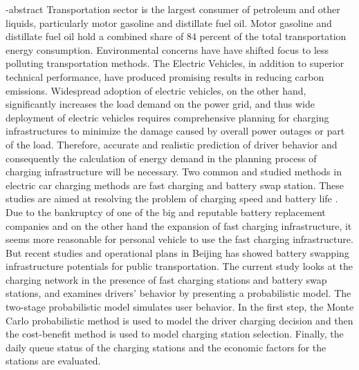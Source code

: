 
\en-abstract{\justifying
Transportation 	sector is the largest consumer of petroleum and other liquids, particularly motor
gasoline and distillate fuel oil. Motor gasoline and distillate fuel oil hold a combined share of 84 percent of the total transportation energy consumption. Environmental concerns have have shifted focus to less polluting transportation methods.	The Electric Vehicles, in addition to superior technical performance, have produced promising results in reducing carbon emissions.
 Widespread adoption of electric vehicles, on the other hand, significantly increases the load demand on the power grid, and thus wide deployment of electric vehicles requires comprehensive planning for charging infrastructures to minimize the damage caused by overall power outages or part of the load.  Therefore, accurate and realistic prediction of driver behavior and consequently the calculation of energy demand in the planning process of charging infrastructure will be necessary.
Two common and studied methods in electric car charging methods are fast charging and battery swap station. These studies are aimed at resolving the problem of charging speed and battery life . Due to the bankruptcy of one of the big and reputable battery replacement companies and on the other hand the expansion of fast charging infrastructure, it seems more reasonable for personal vehicle to use the fast charging infrastructure. But recent studies and operational plans in Beijing has showed battery swapping infrastructure potentials for public transportation.
The current study looks at the charging network in the presence of
 fast charging stations and battery swap stations, and examines drivers' behavior by presenting a probabilistic model. The two-stage probabilistic model simulates user behavior. In the first step, the Monte Carlo probabilistic method is used to model the driver charging decision and then the cost-benefit method is used to model charging station selection. Finally, the daily queue status of the charging stations and the economic factors for the stations are evaluated.}
